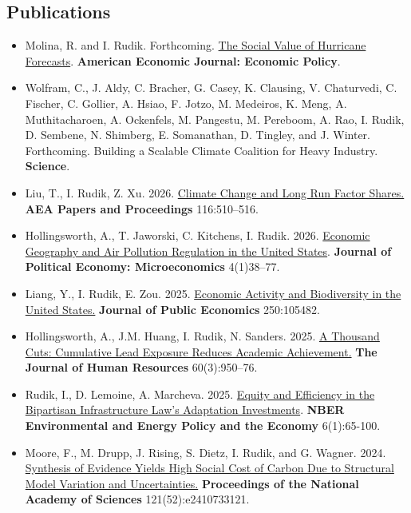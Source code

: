 \documentclass[11pt]{res} %
\begin{document}
\begin{resume}
\subsection{Publications}
\begin{itemize}
	\item[] Molina, R. and I. Rudik. Forthcoming. \href{https://www.nber.org/papers/w32548}{The Social Value of Hurricane Forecasts}. \textbf{American Economic Journal: Economic Policy}.
	\item[] Wolfram, C., J. Aldy, C. Bracher, G. Casey, K. Clausing, V. Chaturvedi, C. Fischer, C. Gollier, A. Hsiao, F. Jotzo, M. Medeiros, K. Meng, A. Muthitacharoen, A. Ockenfels, M. Pangestu, M. Pereboom, A. Rao, I. Rudik, D. Sembene, N. Shimberg, E. Somanathan, D. Tingley, and J. Winter. Forthcoming. Building a Scalable Climate Coalition for Heavy Industry. \textbf{Science}.
	\item[] Liu, T., I. Rudik, Z. Xu. 2026. \href{https://pubs.aeaweb.org/doi/pdfplus/10.1257/pandp.20261025}{Climate Change and Long Run Factor Shares.} \textbf{AEA Papers and Proceedings} 116:510–516.
	\item[] Hollingsworth, A., T. Jaworski, C. Kitchens, I. Rudik. 2026. \href{https://www.journals.uchicago.edu/doi/10.1086/735784}{Economic Geography and Air Pollution Regulation in the United States}. \textbf{Journal of Political Economy: Microeconomics} 4(1)38--77.
	\item[] Liang, Y., I. Rudik, E. Zou. 2025. \href{https://www.sciencedirect.com/science/article/pii/S004727272500180X}{Economic Activity and Biodiversity in the United States.} \textbf{Journal of Public Economics} 250:105482.
	\item[] Hollingsworth, A., J.M. Huang, I. Rudik, N. Sanders. 2025. \href{https://www.nber.org/papers/w28250}{A Thousand Cuts: Cumulative Lead Exposure Reduces Academic Achievement.} \textbf{The Journal of Human Resources} 60(3):950--76.
	\item[] Rudik, I., D. Lemoine, A. Marcheva. 2025. \href{https://www.nber.org/books-and-chapters/environmental-and-energy-policy-and-economy-volume-6/equity-and-efficiency-bipartisan-infrastructure-laws-adaptation-investments}{Equity and Efficiency in the Bipartisan Infrastructure Law’s Adaptation Investments}. \textbf{NBER Environmental and Energy Policy and the Economy} 6(1):65-100.
	\item[] Moore, F., M. Drupp, J. Rising, S. Dietz, I. Rudik, and G. Wagner. 2024. \href{https://www.pnas.org/doi/10.1073/pnas.2410733121}{Synthesis of Evidence Yields High Social Cost of Carbon Due to Structural Model Variation and Uncertainties.} \textbf{Proceedings of the National Academy of Sciences} 121(52):e2410733121.

\end{itemize}
\end{resume}
\end{document}
